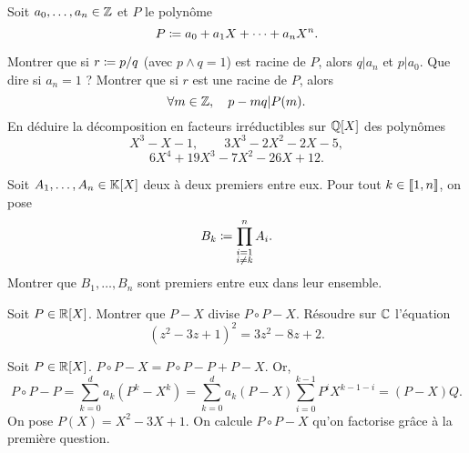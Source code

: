\documentclass{magnolia}
\begin{document}

Soit $a_0,\ldots,a_n \in\mathbb{Z}$ et $P$ le polynôme
$$P\coloneqq a_0+a_1X+\dots+a_nX^n.$$
\begin{questions}
\question Montrer que si $r\coloneqq p/q$ (avec $p\wedge q=1$) est racine de $P$, alors
  $q|a_n$ et $p|a_0$. Que dire si $a_n=1$ ?
\question Montrer que si $r$ est une racine de $P$, alors
  $$\forall m\in\mathbb{Z} ,\quad p-mq|P(m).$$
\question En déduire la décomposition en facteurs irréductibles sur $\polyQ$
  des polynômes
  $$X^3-X-1, \qquad 3X^3-2X^2-2X-5,$$
  $$6X^4+19X^3-7X^2-26X+12.$$
\end{questions}


Soit $A_1,\ldots,A_n\in\polyK$ deux à deux premiers entre eux. Pour tout
$k\in\left\llbracket 1,n\right\rrbracket$, on pose
\[B_k\coloneqq \prod_{\substack{i=1\\i\neq k}}^n A_i.\]
Montrer que $B_1,\ldots,B_n$ sont premiers entre eux dans leur ensemble.




  \begin{questions}
  \question Soit $P\in\polyR$. Montrer que $P-X$ divise $P\circ P-X$.
  \question Résoudre sur $\mathbb{C}$ l'équation
    \[(z^2-3z+1)^2=3z^2-8z+2.\]
  \end{questions}
\begin{sol}
\begin{questions}
  \question Soit $P\in\polyR$. $P\circ P-X=P\circ P-P+P-X$. Or, 
  $$P\circ P-P=\sum_{k=0}^d a_k (P^k-X^k)=\sum_{k=0}^d a_k (P-X) \sum_{i=0}^{k-1}P^iX^{k-1-i}=(P-X)Q.$$
  \question On pose $P(X)=X^2-3X+1$. On calcule $P\circ P-X$ qu'on factorise grâce à la première question.
  \end{questions}
\end{sol}
\end{document}
